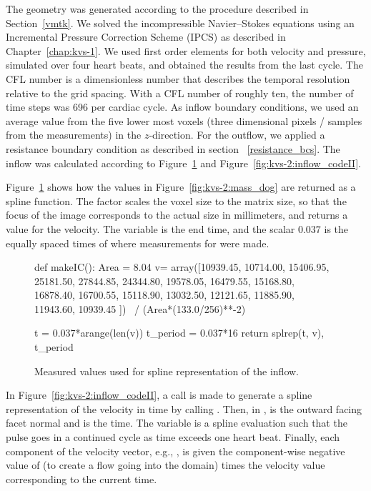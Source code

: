 The geometry was generated according to the procedure described in
Section~\ref{vmtk}. We solved the incompressible Navier--Stokes
equations using an Incremental Pressure Correction Scheme (IPCS) as
described in Chapter~\ref{chap:kvs-1}. We used first order elements
for both velocity and pressure, simulated over four heart beats, and
obtained the results from the last cycle. The CFL number is a
dimensionless number that describes the temporal resolution relative
to the grid spacing.  With a CFL number of roughly ten, the number of
time steps was 696 per cardiac cycle. As inflow boundary conditions,
we used an average value from the five lower most voxels (three
dimensional pixels / samples from the measurements) in the
$z$-direction. For the outflow, we applied a resistance boundary
condition as described in section ~\ref{resistance_bcs}. The inflow
was calculated according to Figure~\ref{fig:kvs-2:inflow_codeI} and
Figure~\ref{fig:kvs-2:inflow_codeII}.

Figure~\ref{fig:kvs-2:inflow_codeI} shows how the values in
Figure~\ref{fig:kvs-2:mass_dog} are returned as a spline function. The
factor  scales the voxel size to the matrix size,
so that the focus of the image corresponds to the actual size in
millimeters, and returns a value for the velocity. The 
variable is the end time, and the scalar $0.037$ is the equally spaced
times of where measurements for  were made.

\begin{figure}
  \begin{center}
    \begin{python}
def makeIC():
    Area = 8.04
    v= array([10939.45, 10714.00, 15406.95,
              25181.50, 27844.85, 24344.80,
              19578.05, 16479.55, 15168.80,
              16878.40, 16700.55, 15118.90,
              13032.50, 12121.65, 11885.90,
              11943.60, 10939.45 ]) \
                    / (Area*(133.0/256)**-2)

    t = 0.037*arange(len(v))
    t_period = 0.037*16
    return splrep(t, v), t_period
    \end{python}
    \caption{Measured values used for spline representation of the inflow.}
    \label{fig:kvs-2:inflow_codeI}
  \end{center}
\end{figure}

In Figure~\ref{fig:kvs-2:inflow_codeII}, a call is made to generate a spline
representation of the velocity in time by calling \emp{makeIC()}.
Then, in \emp{eval\_data}, \emp{n} is the outward facing facet normal
and \emp{t} is the time. The variable \emp{val} is a spline evaluation
such that the pulse goes in a continued cycle as time exceeds one
heart beat. Finally, each component of the velocity vector, e.g.,
\emp{values[0]}, is given the component-wise negative value of 
(to create a flow going into the domain) times the velocity value
corresponding to the current time.

